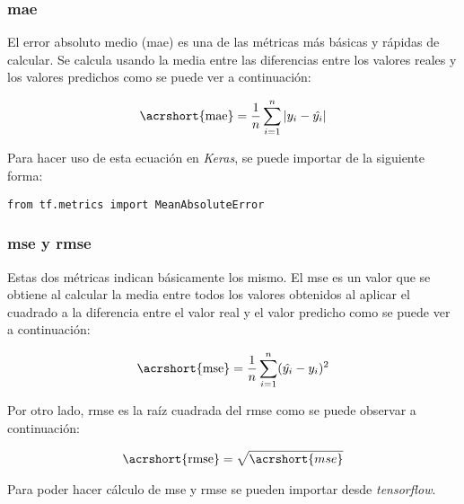\subsubsection{\acrshort{mae}}

El error absoluto medio (\acrshort{mae}) es una de las métricas más básicas y rápidas de calcular. Se calcula usando la media entre las diferencias entre los valores reales y los valores predichos como se puede ver a continuación:

\begin{equation}
\centering
    \begin{split}
        \text{\acrshort{mae}} = \frac{1}{n} \sum_{i=1}^n |y_i - \hat{y_i}|
    \end{split}
\end{equation}

Para hacer uso de esta ecuación en \textit{Keras}, se puede importar de la siguiente forma:


\begin{verbatim}
from tf.metrics import MeanAbsoluteError
\end{verbatim}

\subsubsection{\acrshort{mse} y \acrshort{rmse}}

Estas dos métricas indican básicamente los mismo. El \acrshort{mse} es un valor que se obtiene al calcular la media entre todos los valores obtenidos al aplicar el cuadrado a la diferencia entre el valor real y el valor predicho como se puede ver a continuación:

\begin{equation}
\centering
    \begin{split}
        \text{\acrshort{mse}} = \frac{1}{n} \sum_{i=1}^n (\hat{y_i} - y_i)^2
    \end{split}
\end{equation}

Por otro lado, \acrshort{rmse} es la raíz cuadrada del \acrshort{rmse} como se puede observar a continuación:

\begin{equation}
\centering
    \begin{split}
        \text{\acrshort{rmse}} = \sqrt{\acrshort{mse}}
    \end{split}
\end{equation}

Para poder hacer cálculo de \acrshort{mse} y \acrshort{rmse} se pueden importar desde \textit{tensorflow}.

